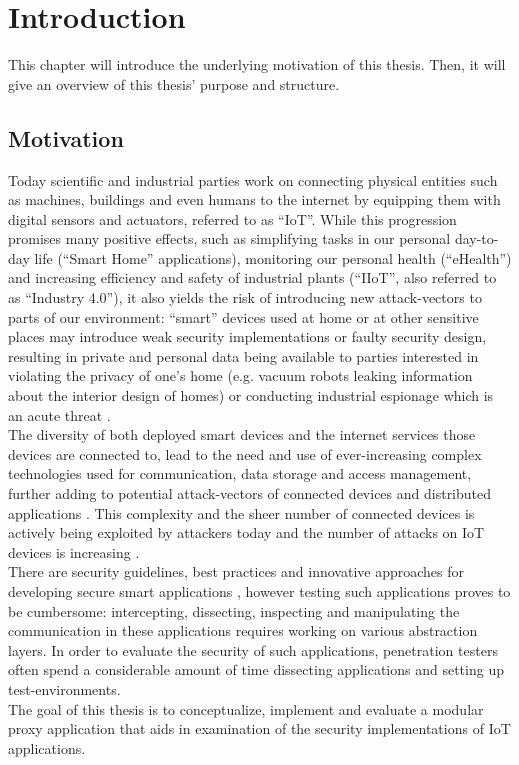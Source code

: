 \chapter{Introduction}
\label{chap:introduction}
This chapter will introduce the underlying motivation of this thesis. Then, it will give an overview of this thesis' purpose and structure. %

\section{Motivation}
Today scientific and industrial parties work on connecting physical entities such as machines, buildings and even humans to the internet by equipping them with digital sensors and actuators, referred to as \enquote{\ac{IoT}}. While this progression promises many positive effects, such as simplifying tasks in our personal day-to-day life (\enquote{Smart Home} applications), monitoring our personal health (\enquote{eHealth})
and increasing efficiency and safety of industrial plants (\enquote{\ac{IIoT}}, also referred to as \enquote{Industry 4.0}), it also yields the risk of introducing new attack-vectors to parts of our environment: \enquote{smart} devices used at home or at other sensitive places may introduce weak security implementations or faulty security design, resulting in private and personal data being available to parties interested in violating the privacy of one's home (e.g. vacuum robots leaking information about the interior design of homes\cite{wittenhorst_2019}) or conducting industrial espionage which is an acute threat \cite[p.~14]{bartsch2018}.\\
The diversity of both deployed smart devices and the internet services those devices are connected to, lead to the need and use of ever-increasing complex technologies used for communication, data storage and access management, further adding to potential attack-vectors of connected devices and distributed applications \cite[p.~119]{Jaeger2016}.
This complexity and the sheer number of connected devices is actively being exploited by attackers today and the number of attacks on \ac{IoT} devices is increasing \cite{demeter_preuss_shmelev_2019}.\\
There are security guidelines, best practices and innovative approaches for developing secure smart applications \cite[p.~120]{Jaeger2016}\cite[p.326-328]{Lesjak2016}, however testing such applications proves to be cumbersome:
intercepting, dissecting, inspecting and manipulating the communication in these applications requires working on various abstraction layers. In order to evaluate the security of such applications, penetration testers often spend a considerable amount of time dissecting applications and setting up test-environments.\\
The goal of this thesis is to conceptualize, implement and evaluate a modular proxy application that aids in examination of the security implementations of \ac{IoT} applications.

